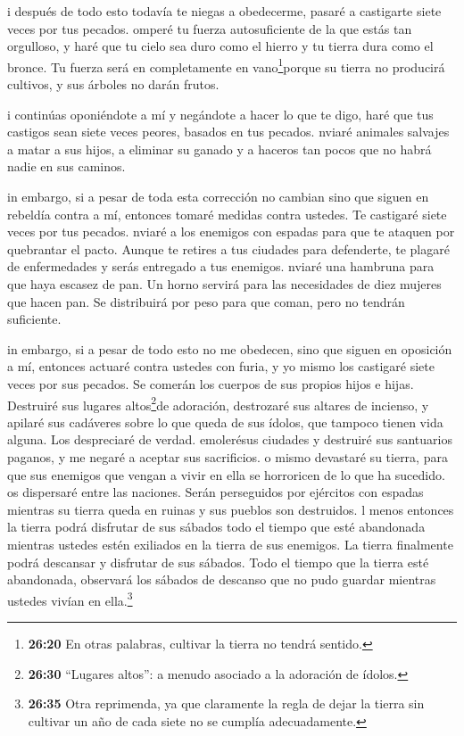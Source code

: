  i después de todo esto todavía te niegas a obedecerme,
pasaré a castigarte siete veces por tus pecados.  omperé tu
fuerza autosuficiente de la que estás tan orgulloso, y haré que tu cielo
sea duro como el hierro y tu tierra dura como el bronce. 
Tu fuerza será en completamente en vano\footnote{\textbf{26:20} En otras
  palabras, cultivar la tierra no tendrá sentido.}porque su tierra no
producirá cultivos, y sus árboles no darán frutos.

 i continúas oponiéndote a mí y negándote a hacer lo que te
digo, haré que tus castigos sean siete veces peores, basados en tus
pecados.  nviaré animales salvajes a matar a sus hijos, a
eliminar su ganado y a haceros tan pocos que no habrá nadie en sus
caminos.

 in embargo, si a pesar de toda esta corrección no cambian
sino que siguen en rebeldía contra a mí,  entonces tomaré
medidas contra ustedes. Te castigaré siete veces por tus pecados.
 nviaré a los enemigos con espadas para que te ataquen por
quebrantar el pacto. Aunque te retires a tus ciudades para defenderte,
te plagaré de enfermedades y serás entregado a tus enemigos.
 nviaré una hambruna para que haya escasez de pan. Un horno
servirá para las necesidades de diez mujeres que hacen pan. Se
distribuirá por peso para que coman, pero no tendrán suficiente.

 in embargo, si a pesar de todo esto no me obedecen, sino
que siguen en oposición a mí,  entonces actuaré contra
ustedes con furia, y yo mismo los castigaré siete veces por sus pecados.
 Se comerán los cuerpos de sus propios hijos e hijas.
 Destruiré sus lugares altos\footnote{\textbf{26:30}
  ``Lugares altos'': a menudo asociado a la adoración de ídolos.}de
adoración, destrozaré sus altares de incienso, y apilaré sus cadáveres
sobre lo que queda de sus ídolos, que tampoco tienen vida alguna. Los
despreciaré de verdad.  emolerésus ciudades y destruiré sus
santuarios paganos, y me negaré a aceptar sus sacrificios. 
o mismo devastaré su tierra, para que sus enemigos que vengan a vivir en
ella se horroricen de lo que ha sucedido.  os dispersaré
entre las naciones. Serán perseguidos por ejércitos con espadas mientras
su tierra queda en ruinas y sus pueblos son destruidos.  l
menos entonces la tierra podrá disfrutar de sus sábados todo el tiempo
que esté abandonada mientras ustedes estén exiliados en la tierra de sus
enemigos. La tierra finalmente podrá descansar y disfrutar de sus
sábados.  Todo el tiempo que la tierra esté abandonada,
observará los sábados de descanso que no pudo guardar mientras ustedes
vivían en ella.\footnote{\textbf{26:35} Otra reprimenda, ya que
  claramente la regla de dejar la tierra sin cultivar un año de cada
  siete no se cumplía adecuadamente.}


